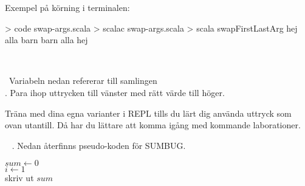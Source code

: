 Exempel på körning i terminalen:
\begin{REPL}
> code swap-args.scala
> scalac swap-args.scala
> scala swapFirstLastArg hej alla barn
barn alla hej
\end{REPL}

\SOLUTION

\TaskSolved \what~


\QUESTEND




\QUESTBEGIN

\Task \what~Variabeln  nedan refererar till samlingen \\. Para ihop uttrycken till vänster med rätt värde till höger.

\begin{ConceptConnections}

\end{ConceptConnections}

\noindent Träna med dina egna varianter i REPL tills du lärt dig använda uttryck som ovan utantill. Då har du lättare att komma igång med kommande laborationer.

\SOLUTION

\TaskSolved \what

\begin{ConceptConnections}

\end{ConceptConnections}

\QUESTEND







\QUESTBEGIN

\Task  \what~ . Nedan återfinns pseudo-koden för SUMBUG.

\begin{algorithm}[H]

 $sum \leftarrow 0$ \\
 $i \leftarrow 1$  \\
 skriv ut $sum$
\end{algorithm}

